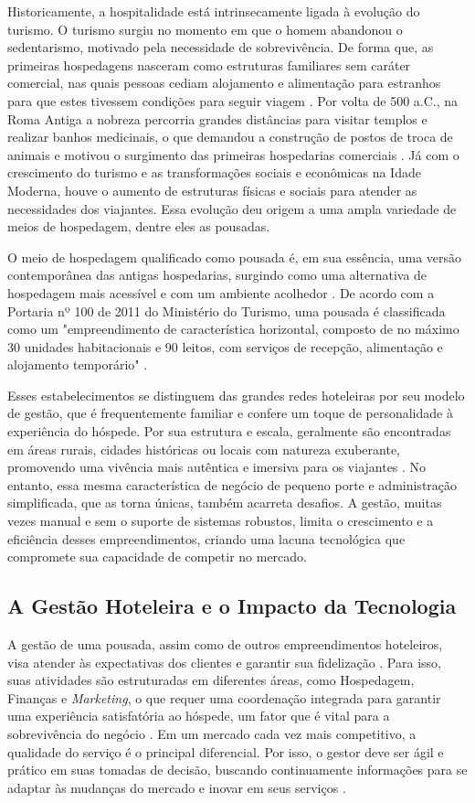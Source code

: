 \documentclass[
	12pt,				%
	openany,			%
	oneside,			%
	a4paper,			%
	english,			%
	french,				%
	spanish,			%
	brazil				%
	]{abntex2}
\begin{document}
Historicamente, a hospitalidade está intrinsecamente ligada à evolução do turismo. O turismo surgiu no momento em que o homem abandonou o sedentarismo, motivado pela necessidade de sobrevivência. De forma que, as primeiras hospedagens nasceram como estruturas familiares sem caráter comercial, nas quais pessoas cediam alojamento e alimentação para estranhos para que estes tivessem condições para seguir viagem \cite{aldrigui2007}. Por volta de 500 a.C., na Roma Antiga a nobreza percorria grandes distâncias para visitar templos e realizar banhos medicinais, o que demandou a construção de postos de troca de animais e motivou o surgimento das primeiras hospedarias comerciais \cite{ignarra2013}. Já com o crescimento do turismo e as transformações sociais e econômicas na Idade Moderna, houve o aumento de estruturas físicas e sociais para atender as necessidades dos viajantes. Essa evolução deu origem a uma ampla variedade de meios de hospedagem, dentre eles as pousadas.

O meio de hospedagem qualificado como pousada é, em sua essência, uma versão contemporânea das antigas hospedarias, surgindo como uma alternativa de hospedagem mais acessível e com um ambiente acolhedor \cite{zanella2006}. De acordo com a Portaria nº 100 de 2011 do Ministério do Turismo, uma pousada é classificada como um "empreendimento de característica horizontal, composto de no máximo 30 unidades habitacionais e 90 leitos, com serviços de recepção, alimentação e alojamento temporário" \cite{portaria100_2011}.

Esses estabelecimentos se distinguem das grandes redes hoteleiras por seu modelo de gestão, que é frequentemente familiar e confere um toque de personalidade à experiência do hóspede. Por sua estrutura e escala, geralmente são encontradas em áreas rurais, cidades históricas ou locais com natureza exuberante, promovendo uma vivência mais autêntica e imersiva para os viajantes \cite{moura2023}. No entanto, essa mesma característica de negócio de pequeno porte e administração simplificada, que as torna únicas, também acarreta desafios. A gestão, muitas vezes manual e sem o suporte de sistemas robustos, limita o crescimento e a eficiência desses empreendimentos, criando uma lacuna tecnológica que compromete sua capacidade de competir no mercado.

\subsection{A Gestão Hoteleira e o Impacto da Tecnologia}
A gestão de uma pousada, assim como de outros empreendimentos hoteleiros, visa atender às expectativas dos clientes e garantir sua fidelização \cite{zanella2006}. Para isso, suas atividades são estruturadas em diferentes áreas, como Hospedagem, Finanças e \textit{Marketing}, o que requer uma coordenação integrada para garantir uma experiência satisfatória ao hóspede, um fator que é vital para a sobrevivência do negócio \cite{martins2011}. Em um mercado cada vez mais competitivo, a qualidade do serviço é o principal diferencial. Por isso, o gestor deve ser ágil e prático em suas tomadas de decisão, buscando continuamente informações para se adaptar às mudanças do mercado e inovar em seus serviços \cite{mauricio2011}.
\end{document}
